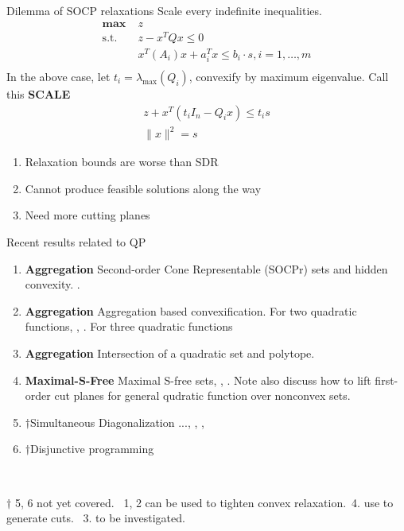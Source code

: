 \documentclass[aspectratio=1610, 10pt]{beamer}
\newcommand{\mx}{\mathbf{\max}\;}
\newcommand{\st}{\mathrm{s.t.\;}}
\begin{document}
\begin{frame}{Dilemma of SOCP relaxations}
  Scale every indefinite inequalities.
  \begin{equation}\label{eq:primal.scale}
    \begin{aligned}
      \mx & z                                                      \\
      \st & z - x^TQx \le 0                                        \\
          & x^T(A_i) x+a_i^T x \leqslant b_i \cdot s,i= 1,\dots, m \\
    \end{aligned}
  \end{equation}
  In the above case, let \(t_i = \lambda_{\max} (Q_i)\), convexify by maximum eigenvalue. Call this \textbf{SCALE}
  \begin{align*}\label{eq.scale}
    z + x^T(t_i I_n - Q_i x) \le t_i s \\
    \|x\|^2= s
  \end{align*}
  \begin{enumerate}
    \item Relaxation bounds are worse than SDR
    \item Cannot produce feasible solutions along the way
    \item Need more cutting planes
  \end{enumerate}
\end{frame}

\begin{frame}{Recent results related to QP}

  \begin{enumerate}
    \item \textbf{Aggregation} Second-order Cone Representable (SOCPr) sets and hidden convexity. \cite{ben-tal_hidden_2014}.
    \item \textbf{Aggregation} Aggregation based convexification. For two quadratic functions, \cite{burer_how_2017}, \cite{modaresi_convex_2017}. For three quadratic functions \cite{dey_obtaining_2021}
    \item \textbf{Aggregation} Intersection of a quadratic set and polytope. \cite{santana_convex_2020}
    \item \textbf{Maximal-S-Free} Maximal S-free sets, \cite{conforti_cut-generating_2015}, \cite{michalka_cutting_2013}. Note \cite{michalka_cutting_2013} also discuss how to lift first-order cut planes for general qudratic function over nonconvex sets.
    \item \(\dagger\)Simultaneous Diagonalization ..., \cite{jiang_novel_2016}, \cite{wang_new_2021}, \cite{wang_geometric_2020}
    \item \(\dagger\)Disjunctive programming
  \end{enumerate}
  \

  \(\dagger\) 5, 6 not yet covered. \
  1, 2 can be used to tighten convex relaxation.\
  4. use to generate cuts. \
  3. to be investigated.

\end{frame}
\end{document}
